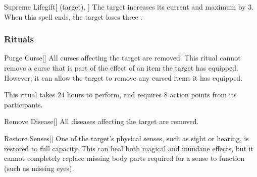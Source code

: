 \lowercase{\hypertarget{spell:Supreme Lifegift}{}}\label{spell:Supreme Lifegift}
\begin{attuneability}[\nth{7}]{\hypertarget{spell:Supreme Lifegift}{Supreme Lifegift}}[ (target), ]
The target increases its current and maximum  by 3.
When this spell ends, the target loses three .
\end{attuneability}
\vspace{0.25em}



\subsubsection{Rituals}


\lowercase{\hypertarget{spell:Purge Curse}{}}\label{spell:Purge Curse}
\begin{apability}[\nth{2}]{\hypertarget{spell:Purge Curse}{Purge Curse}}[]
All curses affecting the target are removed.
This ritual cannot remove a curse that is part of the effect of an item the target has equipped.
However, it can allow the target to remove any cursed items it has equipped.

This ritual takes 24 hours to perform, and requires 8 action points from its participants.
\end{apability}
\vspace{0.25em}



\lowercase{\hypertarget{spell:Remove Disease}{}}\label{spell:Remove Disease}
\begin{apability}[\nth{2}]{\hypertarget{spell:Remove Disease}{Remove Disease}}[]
All diseases affecting the target are removed.
\end{apability}
\vspace{0.25em}



\lowercase{\hypertarget{spell:Restore Senses}{}}\label{spell:Restore Senses}
\begin{apability}[\nth{2}]{\hypertarget{spell:Restore Senses}{Restore Senses}}[]
One of the target's physical senses, such as sight or hearing, is restored to full capacity.
This can heal both magical and mundane effects, but it cannot completely replace missing body parts required for a sense to function (such as missing eyes).
\end{apability}
\vspace{0.25em}



